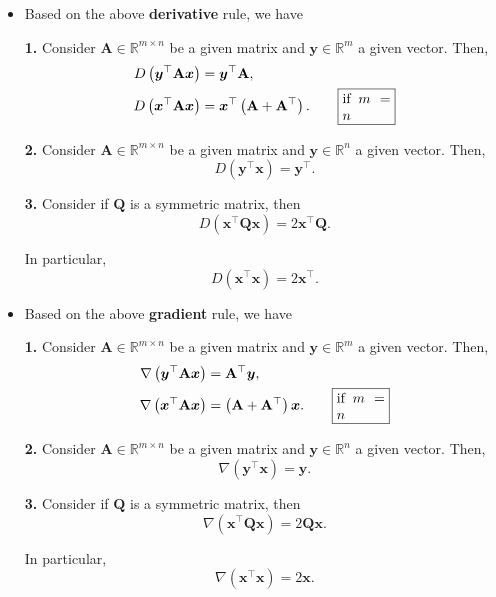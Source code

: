 \documentclass[12pt,thmsa]{article}
\begin{document}
\begin{itemize}
	\item Based on the above \textbf{derivative} rule, we have

	\textbf{1.} Consider \(\mathbf{A} \in \mathbb{R}^{m \times n}\) be a given matrix and \(\boldsymbol{y} \in \mathbb{R}^{m}\) a given vector. Then,
	\begin{align*}
		D\left(\boldsymbol{y}^{\top} \mathbf{A} \boldsymbol{x}\right) &=
		\boldsymbol{y}^{\top} \mathbf{A}, \\
		D\left(\boldsymbol{x}^{\top} \mathbf{A} \boldsymbol{x}\right) &=
		\boldsymbol{x}^{\top}\left(\mathbf{A}+\mathbf{A}^{\top}\right).  \qquad
		\fbox{\parbox{0.1\textwidth}{ if \(m=n\) }}
	\end{align*}
	
	
	\textbf{2.} Consider \(\mathbf{A} \in \mathbb{R}^{m \times n}\) be a given matrix and \(\boldsymbol{y} \in \mathbb{R}^{n}\) a given vector. Then,
	\[ D\left(\boldsymbol{y}^{\top} \boldsymbol{x}\right)=\boldsymbol{y}^{\top}. \]
	
	\textbf{3.} Consider if \(\mathbf{Q}\) is a symmetric matrix, then
	\[
	D\left(\boldsymbol{x}^{\top} \mathbf{Q} \boldsymbol{x}\right)=2 \boldsymbol{x}^{\top} \mathbf{Q}.
	\]
	
	In particular,
	\[
	D\left(\boldsymbol{x}^{\top} \boldsymbol{x}\right)=2 \boldsymbol{x}^{\top}.
	\]

	\item Based on the above \textbf{gradient} rule, we have

	\textbf{1.} Consider \(\mathbf{A} \in \mathbb{R}^{m \times n}\) be a given matrix and \(\boldsymbol{y} \in \mathbb{R}^{m}\) a given vector. Then,
	\begin{align*}
		\nabla \left(\boldsymbol{y}^{\top} \mathbf{A} \boldsymbol{x}\right) &= \mathbf{A}^{\top} \boldsymbol{y}, \\
		\nabla  \left(\boldsymbol{x}^{\top} \mathbf{A} \boldsymbol{x}\right) &=
		\left(\mathbf{A}+\mathbf{A}^{\top}\right) \boldsymbol{x}.  \qquad
		\fbox{\parbox{0.1\textwidth}{ if \(m=n\) }}
	\end{align*}
	
	
	\textbf{2.} Consider \(\mathbf{A} \in \mathbb{R}^{m \times n}\) be a given matrix and \(\boldsymbol{y} \in \mathbb{R}^{n}\) a given vector. Then,
	\[ \nabla \left(\boldsymbol{y}^{\top} \boldsymbol{x}\right)=\boldsymbol{y}. \]
	
	\textbf{3.} Consider if \(\mathbf{Q}\) is a symmetric matrix, then
	\[
	\nabla \left(\boldsymbol{x}^{\top} \mathbf{Q} \boldsymbol{x}\right)=2  \mathbf{Q} \boldsymbol{x}.
	\]
	
	In particular,
	\[
	\nabla \left(\boldsymbol{x}^{\top} \boldsymbol{x}\right)=2 \boldsymbol{x}.
	\]

\end{itemize}
\end{document}
